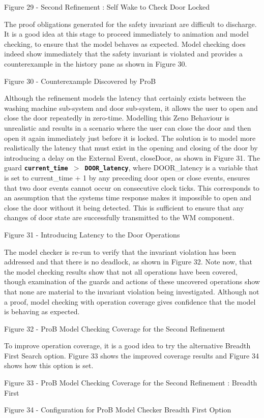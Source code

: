 Figure 29 - Second Refinement : Self Wake to Check Door Locked

The proof obligations generated for the safety invariant are difficult to discharge. It is a good idea at this stage to proceed immediately to animation and model checking, to ensure that the model behaves as expected.
Model checking does indeed show immediately that the safety invariant is violated and provides a counterexample in the history pane as shown in Figure 30.
 
Figure 30 - Counterexample Discovered by ProB

Although the refinement models the latency that certainly exists between the washing machine sub-system and door sub-system, it allows the user to open and close the door repeatedly in zero-time. Modelling this Zeno Behaviour is unrealistic and results in a scenario where the user can close the door and then open it again immediately just before it is locked.
The solution is to model more realistically the latency that must exist in the opening and closing of the door by introducing a delay on the External Event, closeDoor, as shown in Figure 31. The guard  \textbf{\texttt{current\_time $>$ DOOR\_latency}}, where DOOR\_latency is a variable that is set to current\_time + 1 by any preceding door open or close events, ensures that two door events cannot occur on consecutive clock ticks. This corresponds to an assumption that the systems time response makes it impossible to open and close the door without it being detected. This is sufficient to ensure that any changes of door state are successfully transmitted to the WM component.
 
Figure 31 - Introducing Latency to the Door Operations
 
The model checker is re-run to verify that the invariant violation has been addressed and that there is no deadlock, as shown in Figure 32. Note now, that the model checking results show that not all operations have been covered, though examination of the guards and actions of these uncovered operations show that none are material to the invariant violation being investigated. Although not a proof, model checking with operation coverage gives confidence that the model is behaving as expected.
 
Figure 32 - ProB Model Checking Coverage for the Second Refinement 
 
To improve operation coverage, it is a good idea to try the alternative Breadth First Search option. Figure 33 shows the improved coverage results and Figure 34 shows how this option is set.
 
Figure 33 - ProB Model Checking Coverage for the Second Refinement : Breadth First
 
Figure 34 - Configuration for ProB Model Checker Breadth First Option
 
